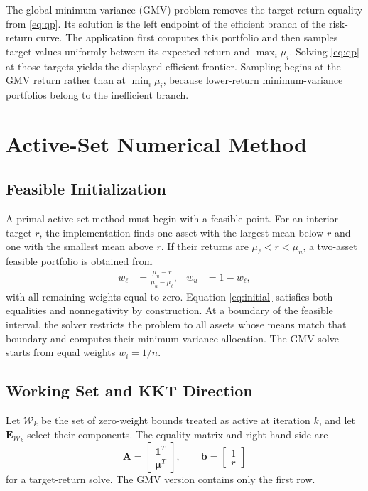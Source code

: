 \documentclass[conference]{IEEEtran}
\newcommand{\vect}[1]{\boldsymbol{#1}}
\newcommand{\mat}[1]{\boldsymbol{#1}}
\begin{document}
The global minimum-variance (GMV) problem removes the target-return equality
from \eqref{eq:qp}. Its solution is the left endpoint of the efficient branch
of the risk-return curve. The application first computes this portfolio and
then samples target values uniformly between its expected return and
$\max_i\mu_i$. Solving \eqref{eq:qp} at those targets yields the displayed
efficient frontier. Sampling begins at the GMV return rather than at
$\min_i\mu_i$, because lower-return minimum-variance portfolios belong to the
inefficient branch.

\section{Active-Set Numerical Method}

\subsection{Feasible Initialization}

A primal active-set method must begin with a feasible point. For an interior
target $r$, the implementation finds one asset with the largest mean below
$r$ and one with the smallest mean above $r$. If their returns are
$\mu_{\ell}<r<\mu_u$, a two-asset feasible portfolio is obtained from
\begin{align}
    w_{\ell} &= \frac{\mu_u-r}{\mu_u-\mu_{\ell}}, &
    w_u &= 1-w_{\ell},
    \label{eq:initial}
\end{align}
with all remaining weights equal to zero. Equation \eqref{eq:initial}
satisfies both equalities and nonnegativity by construction. At a boundary of
the feasible interval, the solver restricts the problem to all assets whose
means match that boundary and computes their minimum-variance allocation. The
GMV solve starts from equal weights $w_i=1/n$.

\subsection{Working Set and KKT Direction}

Let $\mathcal{W}_k$ be the set of zero-weight bounds treated as active at
iteration $k$, and let $\mat{E}_{\mathcal{W}_k}$ select their components. The
equality matrix and right-hand side are
\begin{equation}
 \mat{A}=\begin{bmatrix}\vect{1}^{T}\\\vect{\mu}^{T}\end{bmatrix},
 \qquad
 \vect{b}=\begin{bmatrix}1\\r\end{bmatrix}
 \label{eq:ab}
\end{equation}
for a target-return solve. The GMV version contains only the first row.
\end{document}
